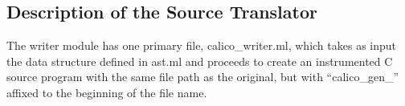 \documentclass[notitlepage]{article}
\begin{document}


\subsection{Description of the Source Translator}

The writer module has one primary file, calico_writer.ml, which takes as input the data structure defined in ast.ml and proceeds to create an instrumented C source program with the same file path as the original, but with ``calico_gen_'' affixed to the beginning of the file name.
\end{document}
